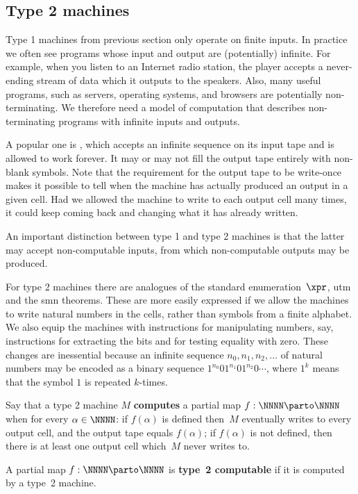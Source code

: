 \subsection{Type 2 machines}
\label{sec:type-2}

Type 1 machines from previous section only operate on finite inputs.
In practice we often see programs whose input and output are
(potentially) infinite. For example, when you listen to an Internet
radio station, the player accepts a never-ending stream of data which
it outputs to the speakers. Also, many useful programs, such as servers, operating systems, and browsers are potentially non-terminating. We therefore need a model of computation that describes non-terminating programs with infinite inputs and outputs.

A popular one is , which accepts an
infinite sequence on its input tape and is allowed to work forever. It
may or may not fill the output tape entirely with non-blank symbols.
Note that the requirement for the output tape to be write-once makes
it possible to tell when the machine has actually produced an output
in a given cell. Had we allowed the machine to write to each output
cell many times, it could keep coming back and changing what it has
already written.

An important distinction between type 1 and type 2 machines is that
the latter may accept non-computable inputs, from which non-computable
outputs may be produced.

For type 2 machines there are analogues of the standard
enumeration~$\xpr$, utm and the smn theorems. These are more easily
expressed if we allow the machines to write natural numbers in the
cells, rather than symbols from a finite alphabet. We also equip the
machines with instructions for manipulating numbers, say, instructions
for extracting the bits and for testing equality with zero. These
changes are inessential because an infinite sequence $n_0, n_1, n_2,
\ldots$ of natural numbers may be encoded as a binary sequence
$1^{n_0}01^{n_1}01^{n_2}0\cdots$, where $1^k$ means that the symbol
$1$ is repeated $k$-times.

\begin{definition}
  Say that a type 2 machine $M$ \textbf{computes} a partial map $f : \NNNN \parto
  \NNNN$ when for every $\alpha \in \NNNN$:
  if $f(\alpha)$ is defined then~$M$ eventually writes to every output cell, and the output tape equals $f(\alpha)$; if $f(\alpha)$ is not defined, then there is at least one output cell which~$M$ never writes to.

  A partial map $f : \NNNN \parto \NNNN$ is \textbf{type~2 computable} if it is computed by a type~2 machine.
\end{definition}

